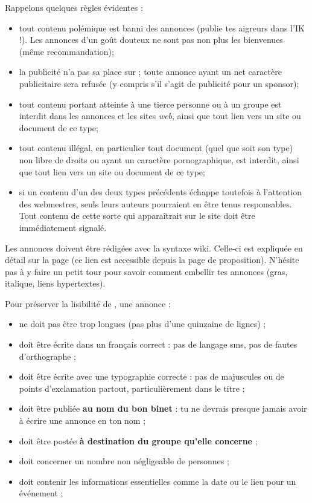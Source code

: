Rappelons quelques r\`egles \'evidentes :
\begin{itemize}
 \item tout contenu pol\'emique est banni des annonces (publie tes aigreurs dans l'IK !).
       Les annonces d'un go\^ut douteux ne sont pas non plus les bienvenues (m\^eme recommandation);
 \item la publicit\'e n'a pas sa place sur \fkz ; toute annonce ayant un net caract\`ere publicitaire
       sera refus\'ee (y compris s'il s'agit de publicit\'e pour un sponsor);
 \item tout contenu portant atteinte \`a  une tierce personne ou \`a  un groupe est interdit dans les annonces
       et les sites \emph{web}, ainsi que tout lien vers un site ou document de ce type;
 \item tout contenu ill\'egal, en particulier tout document (quel que soit son type)
       non libre de droits ou ayant un caract\`ere pornographique, est interdit,
       ainsi que tout lien vers un site ou document de ce type;
 \item si un contenu d'un des deux types pr\'ec\'edents \'echappe toutefois \`a  l'attention des webmestres,
       seuls leurs auteurs pourraient en \^etre tenus responsables.
       Tout contenu de cette sorte qui appara\^itrait sur le site doit \^etre imm\'ediatement signal\'e.
\end{itemize}

Les annonces doivent \^etre r\'edig\'ees avec la syntaxe wiki. Celle-ci est expliqu\'ee en d\'etail sur la page  (ce lien est accessible depuis la page de proposition). N'h\'esite pas \`a  y faire un petit tour pour savoir comment embellir tes annonces (gras, italique, liens hypertextes).

Pour pr\'eserver la lisibilit\'e de \fkz, une annonce :
\begin{itemize}
 \item ne doit pas \^etre trop longues (pas plus d'une quinzaine de lignes) ;
 \item doit \^etre \'ecrite dans un fran\c{c}ais correct : pas de langage sms, pas de fautes d'orthographe ;
 \item doit \^etre \'ecrite avec une typographie correcte : pas de majuscules ou de points d'exclamation partout, particuli\`erement dans le titre ;
 \item doit \^etre publi\'ee \textbf{au nom du bon binet} : tu ne devrais presque jamais avoir \`a \'ecrire une annonce en ton nom ;
 \item doit \^etre post\'ee \textbf{\`a destination du groupe qu'elle concerne} ;
 \item doit concerner un nombre non n\'egligeable de personnes ;
 \item doit contenir les informations essentielles comme la date ou le lieu pour un \'ev\'enement ;
\end{itemize}


